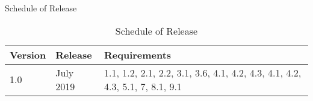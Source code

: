 {{\begin{table}[hbt!]
\begin{adjustbox}{max width=\textwidth}
    \end{adjustbox}
      \caption{Schedule of Release}             
      \label{tab:schedule}                 
    \end{table}
}{
    \begin{table}[hbt!]                    
      \centering
    \begin{adjustbox}{max width=\textwidth}            
      \begin{tabular}{lll}                    
        \toprule          
          Version & 	Release	 & Requirements \\  \hline
          1.0	 & July 2019 & 1.1, 1.2, 2.1, 2.2, 3.1, 3.6, 4.1, 4.2, 4.3, 4.1, 4.2, 4.3, 5.1, 7, 8.1, 9.1\\  \hline
      \end{tabular}
    \end{adjustbox}
      \caption{Schedule of Release}             
      \label{tab:schedule}                 
    \end{table}
}
}

